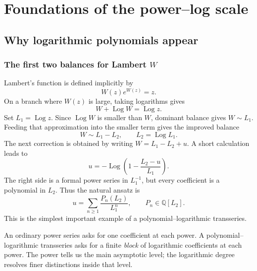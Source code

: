 \documentclass[11pt,openany]{book}
\theoremstyle{definition}
\theoremstyle{plain}
\theoremstyle{remark}
\newcommand{\Q}{\mathbb{Q}}
\DeclareMathOperator{\Log}{Log}
\begin{document}
\tableofcontents
\listoftables
\mainmatter

\part{Foundations of the power--log scale}\label{part:foundations}

\chapter{Why logarithmic polynomials appear}\label{ch:why}

\section{The first two balances for Lambert \texorpdfstring{\(W\)}{W}}
Lambert's function is defined implicitly by
\begin{equation}\label{eq:Wdef-preview}
 W(z)e^{W(z)}=z.
\end{equation}
On a branch where \(W(z)\) is large, taking logarithms gives
\begin{equation}\label{eq:Wlog-preview}
 W+\Log W=\Log z.
\end{equation}
Set \(L_1=\Log z\). Since \(\Log W\) is smaller than \(W\), dominant balance gives \(W\sim L_1\). Feeding that approximation into the smaller term gives the improved balance
\[
 W\sim L_1-L_2,
 \qquad L_2=\Log L_1.
\]
The next correction is obtained by writing \(W=L_1-L_2+u\). A short calculation leads to
\begin{equation}\label{eq:preview-fixed}
 u=-\Log\left(1-\frac{L_2-u}{L_1}\right).
\end{equation}
The right side is a formal power series in \(L_1^{-1}\), but every coefficient is a polynomial in \(L_2\). Thus the natural ansatz is
\begin{equation}\label{eq:preview-ansatz}
 u=\sum_{n\ge1}\frac{P_n(L_2)}{L_1^n},
 \qquad P_n\in\Q[L_2].
\end{equation}
This is the simplest important example of a polynomial--logarithmic transseries.

\begin{intuitionbox}
An ordinary power series asks for one coefficient at each power. A polynomial--logarithmic transseries asks for a finite \emph{block} of logarithmic coefficients at each power. The power tells us the main asymptotic level; the logarithmic degree resolves finer distinctions inside that level.
\end{intuitionbox}
\end{document}
